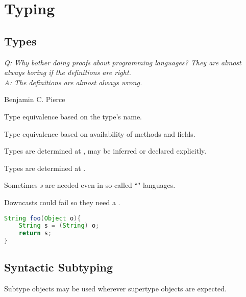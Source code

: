 \documentclass{article}
\begin{document}
\section{Typing}

\subsection{Types}

\epigraph{\itshape Q: Why bother doing proofs about programming languages? They are almost always boring if the definitions are right. \\
A: The definitions are almost always wrong.}{Benjamin C. Pierce }

\begin{definition}
Type equivalence based on the type's name.
\end{definition}

\begin{definition}
Type equivalence based on availability of methods and fields.
\end{definition}

\begin{definition}
Types are determined at \compiletime{}, may be inferred or declared explicitly.
\end{definition}

\begin{definition}
Types are determined at \runtime{}.
\end{definition}

Sometimes \textit{\runtimecheck{}s} are needed even in so-called ``\static{}" languages.

\begin{example}[Downcasts]
Downcasts could fail so they need a \runtimecheck{}.
\begin{lstlisting}[language=Java, escapechar=|]
String foo(Object o){
    String s = (String) o;
    return s;
}
\end{lstlisting}
\end{example}

\subsection{Syntactic Subtyping}

\begin{definition}[\subprincip{}]
    Subtype objects may be used wherever supertype objects are expected.
\end{definition}
\end{document}
